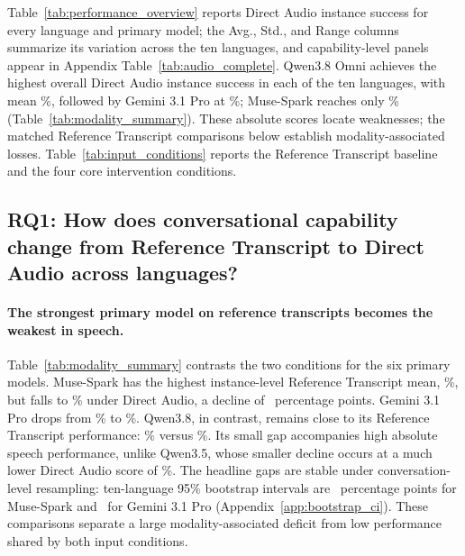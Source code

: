 \documentclass{article}
\begin{document}
Table~\ref{tab:performance_overview} reports Direct Audio instance success for every language and primary model; the Avg., Std., and Range columns summarize its variation across the ten languages, and capability-level panels appear in Appendix Table~\ref{tab:audio_complete}. Qwen3.8 Omni achieves the highest overall Direct Audio instance success in each of the ten languages, with mean \resQNewAudio\%, followed by Gemini 3.1 Pro at \resGProAudio\%; Muse-Spark reaches only \resMuseAudio\% (Table~\ref{tab:modality_summary}). These absolute scores locate weaknesses; the matched Reference Transcript comparisons below establish modality-associated losses. Table~\ref{tab:input_conditions} reports the Reference Transcript baseline and the four core intervention conditions.



\subsection{RQ1: How does conversational capability change from Reference Transcript to Direct Audio across languages?}
\label{sec:cross_modal_results}



\paragraph{The strongest primary model on reference transcripts becomes the weakest in speech.}
Table~\ref{tab:modality_summary} contrasts the two conditions for the six primary models. Muse-Spark has the highest instance-level Reference Transcript mean, \resMuseText\%, but falls to \resMuseAudio\% under Direct Audio, a decline of \resMuseGap\ percentage points. Gemini 3.1 Pro drops from \resGProText\% to \resGProAudio\%. Qwen3.8, in contrast, remains close to its Reference Transcript performance: \resQNewText\% versus \resQNewAudio\%. Its small gap accompanies high absolute speech performance, unlike Qwen3.5, whose smaller decline occurs at a much lower Direct Audio score of \resQOldAudio\%. The headline gaps are stable under conversation-level resampling: ten-language 95\% bootstrap intervals are \resMuseGapCI\ percentage points for Muse-Spark and \resGProGapCI\ for Gemini 3.1 Pro (Appendix~\ref{app:bootstrap_ci}). These comparisons separate a large modality-associated deficit from low performance shared by both input conditions.
\end{document}
